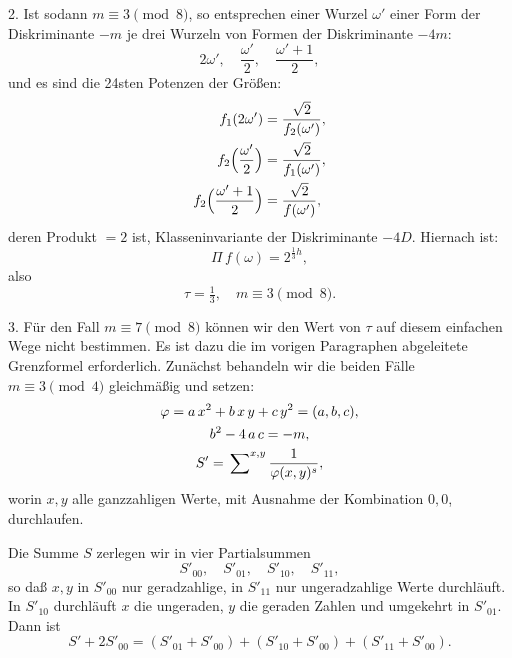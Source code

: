 \documentclass[12pt,a4paper]{article}
\theoremstyle{definition}
\begin{document}
2. Ist sodann $m \equiv 3 \pmod 8$, so entsprechen einer Wurzel $\omega'$ 
einer Form der Diskriminante $-m$ je drei Wurzeln von Formen der 
Diskriminante $-4m$:
\[
2\omega',\quad \frac{\omega'}{2},\quad \frac{\omega' + 1}{2},
\]
und es sind die 24sten Potenzen der Größen:
\begin{align*}
f_{1}(2\omega') &= \frac{\sqrt{2}}{f_{2}(\omega')},\\
f_{2}\Bigl(\frac{\omega'}{2}\Bigr) &= \frac{\sqrt{2}}{f_{1}(\omega')},\\
f_{2}\Bigl(\frac{\omega' + 1}{2}\Bigr) &= \frac{\sqrt{2}}{f(\omega')},
\end{align*}
deren Produkt $= 2$ ist, Klasseninvariante der Diskriminante $-4D$. 
Hiernach ist:
\[
\varPi\,f(\omega) = 2^{\frac{1}{3}h},
\]
also
\begin{equation}
\tau = \tfrac{1}{3},\quad m \equiv 3 \pmod 8.
\end{equation}

3. Für den Fall $m \equiv 7 \pmod 8$ können wir den Wert von $\tau$ auf 
diesem einfachen Wege nicht bestimmen. Es ist dazu die im vorigen 
Paragraphen abgeleitete Grenzformel erforderlich. Zunächst behandeln wir 
die beiden Fälle $m \equiv 3 \pmod 4$ gleichmäßig und setzen:
\begin{gather}
\varphi = a\,x^{2} + b\,x\,y + c\,y^{2} = (a, b, c),\notag\\
b^{2} - 4\,a\,c = -m,\notag\\
S' = \sideset{}{^{x,y}}\sum\frac{1}{\varphi(x,y)^{s}},
\end{gather}
worin $x, y$ alle ganzzahligen Werte, mit Ausnahme der Kombination $0, 0$, 
durchlaufen.

Die Summe $S$ zerlegen wir in vier Partialsummen
\[
S'_{00},\quad S'_{01},\quad S'_{10},\quad S'_{11},
\]
so daß $x, y$ in $S'_{00}$ nur geradzahlige, in $S'_{11}$ nur ungeradzahlige 
Werte durchläuft. In $S'_{10}$ durchläuft $x$ die ungeraden, $y$ die 
geraden Zahlen und umgekehrt in $S'_{01}$. Dann ist
\begin{equation}
S' + 2S'_{00} = (S'_{01} + S'_{00}) + (S'_{10} + S'_{00}) + (S'_{11} + S'_{00}).
\end{equation}
\end{document}
